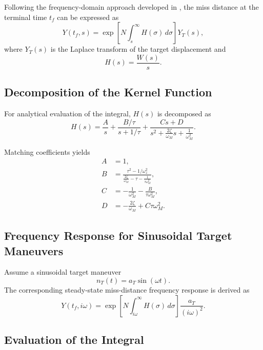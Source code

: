 \documentclass[11pt,a4paper]{article}
\begin{document}
Following the frequency-domain approach developed in \cite{Yanushevsky2004,Yanushevsky2007}, the miss distance at the terminal time $t_f$ can be expressed as
\begin{equation}
Y(t_f,s) =
\exp\!\left[
N \int_s^{\infty} H(\sigma)\,d\sigma
\right] Y_T(s),
\end{equation}
where $Y_T(s)$ is the Laplace transform of the target displacement and
\begin{equation}
H(s) = \frac{W(s)}{s}.
\end{equation}

\subsection{Decomposition of the Kernel Function}

For analytical evaluation of the integral, $H(s)$ is decomposed as \cite{Yanushevsky2006}
\begin{equation}
H(s) =
\frac{A}{s}
+
\frac{B/\tau}{s + 1/\tau}
+
\frac{Cs + D}
{s^2 + \frac{2\zeta}{\omega_M}s + \frac{1}{\omega_M^2}}.
\end{equation}

Matching coefficients yields
\begin{align}
A &= 1, \\
B &= \frac{\tau^2 - 1/\omega_z^2}
{\frac{2\zeta}{\omega_M} - \tau - \frac{1}{\tau \omega_M^2}}, \\
C &= -\frac{1}{\omega_M^2} - \frac{B}{\tau \omega_M^2}, \\
D &= -\frac{2\zeta}{\omega_M} + C \tau \omega_M^2 .
\end{align}

\subsection{Frequency Response for Sinusoidal Target Maneuvers}

Assume a sinusoidal target maneuver
\begin{equation}
n_T(t) = a_T \sin(\omega t).
\end{equation}
The corresponding steady-state miss-distance frequency response is derived as
\begin{equation}
Y(t_f,i\omega) =
\exp\!\left[
N \int_{i\omega}^{\infty} H(\sigma)\,d\sigma
\right]
\frac{a_T}{(i\omega)^2}.
\end{equation}

\subsection{Evaluation of the Integral}
\end{document}
